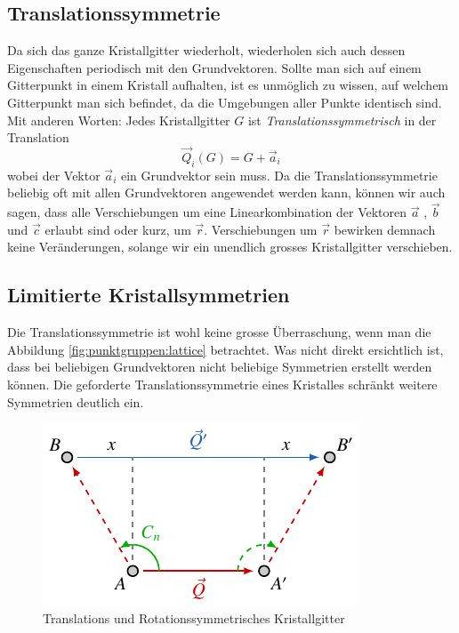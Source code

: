 
\subsection{Translationssymmetrie} 
Da sich das ganze Kristallgitter wiederholt, wiederholen sich auch dessen Eigenschaften periodisch mit den Grundvektoren.
Sollte man sich auf einem Gitterpunkt in einem Kristall aufhalten, ist es unmöglich zu wissen, auf welchem Gitterpunkt man sich befindet, 
da die Umgebungen aller Punkte identisch sind. 
Mit anderen Worten: Jedes Kristallgitter $ G $ ist \emph{Translationssymmetrisch} in der Translation 
\[
    \vec{Q}_i(G) = G + \vec{a}_i
\] wobei der Vektor $\vec{a}_i$ ein Grundvektor sein muss.
Da die Translationssymmetrie beliebig oft mit allen Grundvektoren angewendet werden kann, 
können wir auch sagen, dass alle Verschiebungen um eine Linearkombination 
der Vektoren $\vec{a}$ , $\vec{b}$ und $\vec{c}$ erlaubt sind oder kurz, um $\vec{r}$. 
Verschiebungen um $\vec{r}$ bewirken demnach keine Veränderungen, 
solange wir ein unendlich grosses Kristallgitter verschieben.

\subsection{Limitierte Kristallsymmetrien} \label{txt:punktgruppen: Translationssymmetrie}
 Die Translationssymmetrie ist wohl keine grosse Überraschung, wenn man die Abbildung \ref{fig:punktgruppen:lattice} betrachtet.
 Was nicht direkt ersichtlich ist, dass bei beliebigen Grundvektoren nicht beliebige Symmetrien erstellt werden können.
 Die geforderte Translationssymmetrie eines Kristalles schränkt weitere Symmetrien deutlich ein.
  
\begin{figure}
    \centering
    \includegraphics[]{papers/punktgruppen/figures/combine-symmetries}
    \caption{
        Translations und Rotationssymmetrisches Kristallgitter
    }
    \label{fig:punktgruppen:rot-geometry}
\end{figure}

